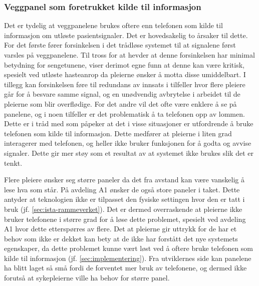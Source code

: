 \subsubsection{Veggpanel som foretrukket kilde til informasjon}
Det er tydelig at veggpanelene brukes oftere enn telefonen som kilde til informasjon om utløste pasientsignaler. Det er hovedsakelig to årsaker til dette. For det første fører forsinkelsen i det trådløse systemet til at signalene først varsles på veggpanelene. Til tross for at \citet{Sletten09} hevder at denne forsinkelsen har minimal betydning for sengetunene, viser derimot egne funn at denne kan være kritisk, spesielt ved utløste hasteanrop da pleierne ønsker å motta disse umiddelbart. I tillegg kan forsinkelsen føre til redundans av innsats i tilfeller hvor flere pleiere går for å besvare samme signal, og en unødvendig avbrytelse i arbeidet til de pleierne som blir overflødige. For det andre vil det ofte være enklere å se på panelene, og i noen tilfeller er det problematisk å ta telefonen opp av lommen.  Dette er i tråd med \citet{klemets13} som påpeker at det i visse situasjoner er utfordrende å bruke telefonen som kilde til informasjon. Dette medfører at pleierne i liten grad interagerer med telefonen, og heller ikke bruker funksjonen for å godta og avvise signaler. Dette gir mer støy som et resultat av at systemet ikke brukes slik det er tenkt.

\noindent
Flere pleiere ønsker seg større paneler da det fra avstand kan være vanskelig å lese hva som står. På avdeling A1 ønsker de også store paneler i taket. Dette antyder at teknologien ikke er tilpasset den fysiske settingen hvor den er tatt i bruk (jf. \ref{sec:ista-rammeverket}). Det er dermed overraskende at pleierne ikke bruker telefonene i større grad for å løse dette problemet, spesielt ved avdeling A1 hvor dette etterspørres av flere. Det at pleierne gir uttrykk for de har et behov som ikke er dekket kan bety at de ikke har forstått det nye systemets egenskaper, da dette problemet kunne vært løst ved å oftere bruke telefonen som kilde til informasjon (jf. \ref{sec:implementering}). Fra utviklernes side kan panelene ha blitt laget så små fordi de forventet mer bruk av telefonene, og dermed ikke forutså at sykepleierne ville ha behov for større panel. 


